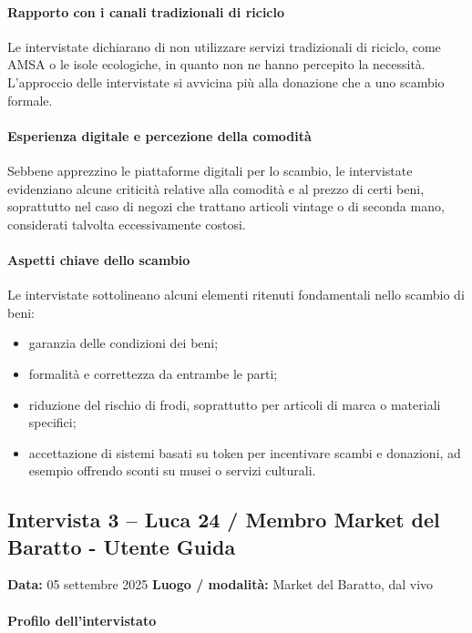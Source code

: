 \documentclass[12pt,a4paper]{article}
\begin{document}
\paragraph{Rapporto con i canali tradizionali di riciclo}

Le intervistate dichiarano di non utilizzare servizi tradizionali di riciclo, come AMSA o le isole ecologiche, in quanto non ne hanno percepito la necessità. L’approccio delle intervistate si avvicina più alla donazione che a uno scambio formale.

\paragraph{Esperienza digitale e percezione della comodità}

Sebbene apprezzino le piattaforme digitali per lo scambio, le intervistate evidenziano alcune criticità relative alla comodità e al prezzo di certi beni, soprattutto nel caso di negozi che trattano articoli vintage o di seconda mano, considerati talvolta eccessivamente costosi.

\paragraph{Aspetti chiave dello scambio}

Le intervistate sottolineano alcuni elementi ritenuti fondamentali nello scambio di beni:
\begin{itemize}
  \item garanzia delle condizioni dei beni;
  \item formalità e correttezza da entrambe le parti;
  \item riduzione del rischio di frodi, soprattutto per articoli di marca o materiali specifici;
  \item accettazione di sistemi basati su token per incentivare scambi e donazioni, ad esempio offrendo sconti su musei o servizi culturali.
\end{itemize}

\newpage

\subsection{Intervista 3 – Luca 24 / Membro Market del Baratto - Utente Guida}
\textbf{Data:} 05 settembre 2025  
\textbf{Luogo / modalità:} Market del Baratto, dal vivo  

\paragraph{Profilo dell’intervistato}
\end{document}
